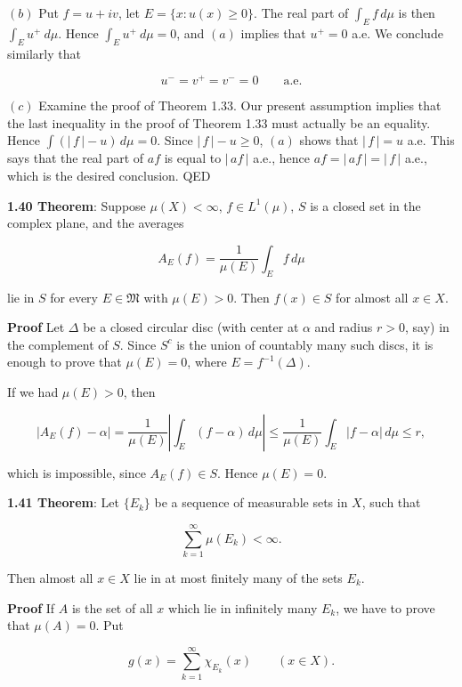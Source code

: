 \documentclass[11pt]{article}
\begin{document}
\((b)\) Put \(f=u+iv\), let \(E=\{x\colon u(x)\geq 0\}\). The real part of \(\int_{E}f\,d\mu\) is then \(\int_{E}u^{ + }\ d\mu\). Hence \(\int_{E}u^{ + }\ d\mu=0\), and \((a)\) implies that \(u^{ + }=0\) a.e. We conclude similarly that

\[
  u^{-}=v^{+}=v^{-}=0\qquad\text{a.e.}
  \]

\((c)\) Examine the proof of Theorem 1.33. Our present assumption implies that the last inequality in the proof of Theorem 1.33 must actually be an equality. Hence \(\int\left(|\,f\,|-u\right)\,d\mu=0\). Since \(|\,f\,|-u\geq 0\), \((a)\) shows that \(|\,f\,|=u\) a.e. This says that the real part of \(af\) is equal to \(|\,af\,|\) a.e., hence \(af=|\,af\,|=|\,f\,|\) a.e., which is the desired conclusion. QED

\label{org20412c9}
\textbf{\textbf{1.40 Theorem}}: Suppose \(\mu(X)<\infty\), \(f\in L^{1}(\mu)\), \(S\) is a closed set in the complex plane, and the averages

\[
A_{E}(f)=\frac{1}{\mu(E)}\int_{E}f\,d\mu
\]

lie in \(S\) for every \(E\in\mathfrak{M}\) with \(\mu(E)>0\). Then \(f(x)\in S\) for almost all \(x\in X\).

\textbf{\textbf{Proof}} Let \(\Delta\) be a closed circular disc (with center at \(\alpha\) and radius \(r > 0\), say) in the complement of \(S\). Since \(S^{c}\) is the union of countably many such discs, it is enough to prove that \(\mu(E) = 0\), where \(E = f^{-1}(\Delta)\).

If we had \(\mu(E) > 0\), then

\[|A_{E}(f) - \alpha| = \frac{1}{\mu(E)} \left| \int_{E} (f - \alpha) \, d\mu \right| \leq \frac{1}{\mu(E)} \int_{E} |f - \alpha| \, d\mu \leq r,\]

which is impossible, since \(A_{E}(f) \in S\). Hence \(\mu(E) = 0\).

\label{orgc890602}
\textbf{\textbf{1.41 Theorem}}: Let \(\{E_{k}\}\) be a sequence of measurable sets in \(X\), such that

\[
\sum_{k=1}^{\infty} \mu(E_{k}) < \infty.\tag{1}
\]

Then almost all \(x \in X\) lie in at most finitely many of the sets \(E_{k}\).

\textbf{\textbf{Proof}} If \(A\) is the set of all \(x\) which lie in infinitely many \(E_{k}\), we have to prove that \(\mu(A) = 0\). Put

\[
g(x) = \sum_{k=1}^{\infty} \chi_{E_{k}}(x) \qquad (x \in X).\tag{2}\]
\end{document}

